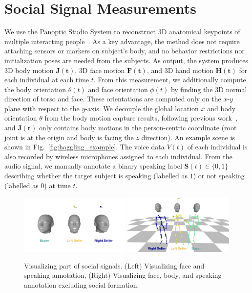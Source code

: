 \section{Social Signal Measurements}
We use the Panoptic Studio System to reconstruct 3D anatomical keypoints of multiple interacting people~\cite{joo2017panoptic, joo2018}. As a key advantage, the method does not require attaching sensors or markers on subject's body, and no behavior restrictions nor initialization poses are needed from the subjects. As output, the system produces 3D body motion $\mathbf{J(t)}$, 3D face motion $\mathbf{F(t)}$, and 3D hand motion $\mathbf{H(t)}$ for each individual at each time $t$. From this measurement, we additionally compute the body orientation $\theta(t)$ and face orientation $\phi(t)$ by finding the 3D normal direction of torso and face. These orientations are computed only on the $x$-$y$ plane with respect to the $y$-axis. We decouple the global location $x$ and body orientation $\theta$ from the body motion capture results, following previous work~\cite{jain2016structural, holden2016deep}, and $\mathbf{J(t)}$ only contains body motions in the person-centric coordinate (root joint is at the origin and body is facing the $z$ direction). An example scene is shown in Fig.~\ref{fig:haggling_example}. The voice data $V(t)$ of each individual is also recorded by wireless microphones assigned to each individual. From the audio signal, we manually annotate a binary speaking label $\mathbf{S}(t) \in \{0,1\}$ describing whether the target subject is speaking (labelled as $1$) or not speaking (labelled as $0$) at time $t$.


\begin{figure}
	\centering
	\includegraphics[width=0.49\textwidth]{ssp_fig/haggling_ex_face}
	\includegraphics[width=0.49\textwidth]{ssp_fig/haggling_ex_facebody}
	\caption{Visualizing part of social signals. (Left) Visualizing face and speaking annotation, (Right) Visualizing face, body, and speaking annotation excluding social formation.} 
	\label{fig:haggling_measurement_vis}
\end{figure}

